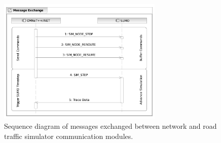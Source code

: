 \begin{figure}[H]
    \centering
    \includegraphics[width=0.7\textwidth]{fig/message-diagram.png}
    \caption{Sequence diagram of messages exchanged between network
    and road traffic simulator communication modules.}
    \label{fig:diagram}
\end{figure}
\newpage
